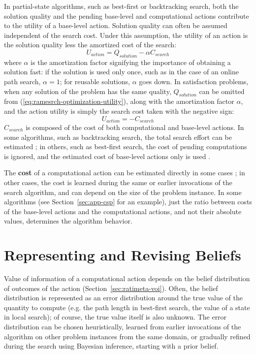 In partial-state algorithms, such as best-first or backtracking
search, both the solution quality and the pending base-level and
computational actions contribute to the utility of a base-level
action. Solution quality can often be assumed independent of the
search cost. Under this assumption, the utility of an action is the solution quality
less the amortized cost of the search:
\begin{equation}
\label{eq:ramesrch-optimization-utility}
U_{action}=Q_{solution}-\alpha C_{search}
\end{equation} where $\alpha$ is the amortization factor signifying the
importance of obtaining a solution fast: if the solution is used only
once, such as in the case of an online path search, $\alpha=1$; for
reusable solutions, $\alpha$ goes down. In satisfaction problems, when
any solution of the problem has the same quality, $Q_{solution}$
can be omitted from (\ref{eq:ramesrch-optimization-utility}), along
with the amortization factor $\alpha$, and the action utility is
simply the search cost taken with the negative sign:
\begin{equation}
\label{eq:ramesrch-satisfaction-utility} U_{action}=-C_{search}
\end{equation} $C_{search}$ is composed of the cost of both
computational and base-level actions. In some algorithms, such as
backtracking search, the total search effort can be estimated
\cite{Knuth.backtrack}\cite{Refalo.impact}; in others, such as
best-first search, the cost of pending computations is ignored, and
the estimated cost of base-level actions only is used
\cite{Russell.right}.

The {\bf cost} of a computational action can be estimated directly in
some cases \cite{Russell.right}; in other cases, the cost is learned
during the same or earlier invocations of the search algorithm, and
can depend on the size of the problem instance. In some algorithms
(see Section~\ref{sec:app-csp} for an example), just the ratio between
costs of the base-level actions and the computational actions, and not
their absolute values, determines the algorithm behavior.

\section{Representing and Revising Beliefs}

Value of information of a computational action depends on the belief
distribution of outcomes of the action
(Section~\ref{sec:ratimeta-voi}).  Often, the belief distribution is
represented as an error distribution around the true value of the
quantity to compute (e.g. the path length in best-first search, the
value of a state in local search); of course, the true value itself is
also unknown.  The error distribution can be chosen heuristically,
learned from earlier invocations of the algorithm on other problem
instances from the same domain, or gradually refined during the search
using Bayesian inference, starting with a prior belief.

